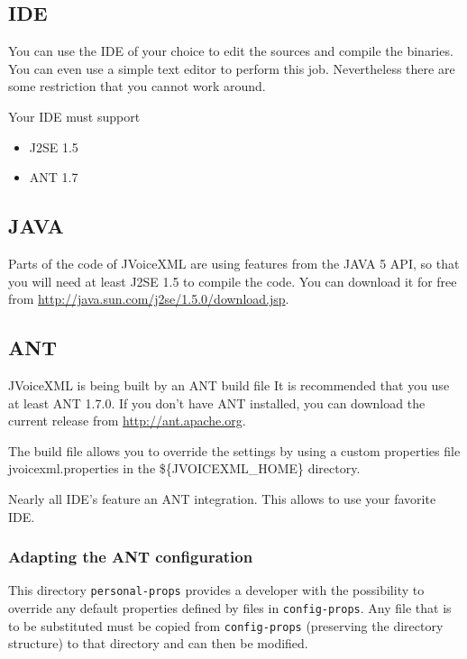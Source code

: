 \documentclass[11pt,a4paper]{article}
\begin{document}
\subsection{IDE}
\label{sec:ide}

You can use the IDE of your choice to edit the sources and compile the 
binaries. You can even use a simple text editor to perform this job.
Nevertheless there are some restriction that you cannot work around.

Your IDE must support

\begin{itemize}
\item J2SE 1.5
\item ANT 1.7
\end{itemize}

\subsection{JAVA}
\label{sec:java}

Parts of the code of JVoiceXML are using features from the JAVA 5 API, so that
you will need at least J2SE 1.5 to compile the code. You can download it
for free from \url{http://java.sun.com/j2se/1.5.0/download.jsp}.

\subsection{ANT}
\label{sec:ant}

JVoiceXML is being built by an ANT build file It is recommended that
you use at least ANT 1.7.0. 
If you don't have ANT installed, you can download the current release
from \url{http://ant.apache.org}.

The build file allows you to override the settings by using a custom 
properties file jvoicexml.properties in the \$\{JVOICEXML\_HOME\}
directory.

Nearly all IDE's feature an ANT integration. This allows to use
your favorite IDE.

\subsubsection{Adapting the ANT configuration}

This directory \texttt{personal-props} provides a developer with the 
possibility to override any 
default properties defined by files in \texttt{config-props}. 
Any file that is to be
substituted must be copied from \texttt{config-props} 
(preserving the directory structure) to that directory and can then be 
modified.
\end{document}
